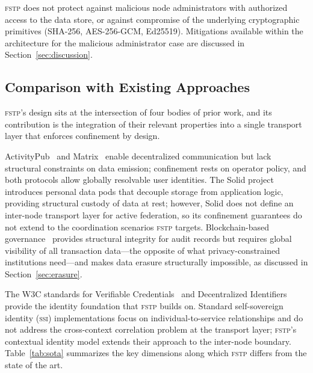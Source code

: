 \documentclass[12pt]{article}
\newcommand{\FSTP}{\textsc{fstp}}
\begin{document}
	\FSTP{} does not protect against malicious node administrators with
	authorized access to the data store, or against compromise of the
	underlying cryptographic primitives (SHA-256, AES-256-GCM, Ed25519).
	Mitigations available within the architecture for the malicious
	administrator case are discussed in Section~\ref{sec:discussion}.
	
	\subsection{Comparison with Existing Approaches}
	\label{sec:comparison}
	
	\FSTP{}'s design sits at the intersection of four bodies of prior work,
	and its contribution is the integration of their relevant properties
	into a single transport layer that enforces confinement by design.
	
	ActivityPub~\cite{w3c2018activitypub} and Matrix~\cite{matrix2022spec}
	enable decentralized communication but lack structural constraints on
	data emission; confinement rests on operator policy, and both protocols
	allow globally resolvable user identities. The Solid
	project~\cite{berners2016solid} introduces personal data pods that
	decouple storage from application logic, providing structural custody
	of data at rest; however, Solid does not define an inter-node transport
	layer for active federation, so its confinement guarantees do not
	extend to the coordination scenarios \FSTP{} targets.
	Blockchain-based governance~\cite{hassan2021dao} provides structural
	integrity for audit records but requires global visibility of all
	transaction data---the opposite of what privacy-constrained institutions
	need---and makes data erasure structurally impossible, as discussed in
	Section~\ref{sec:erasure}.
	
	The W3C standards for Verifiable Credentials~\cite{w3c2022vc} and
	Decentralized Identifiers~\cite{w3c2022did} provide the identity
	foundation that \FSTP{} builds on. Standard self-sovereign identity
	(\textsc{ssi}) implementations focus on individual-to-service
	relationships and do not address the cross-context correlation problem
	at the transport layer; \FSTP{}'s contextual identity model extends
	their approach to the inter-node boundary. Table~\ref{tab:sota}
	summarizes the key dimensions along which \FSTP{} differs from the
	state of the art.
	
\end{document}
